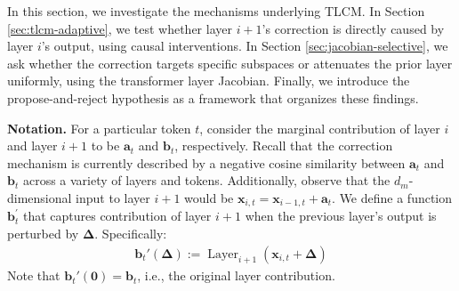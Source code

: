 \label{big_sec:tlcm_adaptive}

In this section, we investigate the mechanisms underlying TLCM. In Section \ref{sec:tlcm-adaptive}, we test whether layer $i+1$'s correction is directly caused by layer $i$'s output, using causal interventions. In Section \ref{sec:jacobian-selective}, we ask whether the correction targets specific subspaces or attenuates the prior layer uniformly, using the transformer layer Jacobian. Finally, we introduce the propose-and-reject hypothesis as a framework that organizes these findings.



\textbf{Notation.} For a particular token $t$, consider the marginal contribution of layer $i$ and layer $i+1$ to be $\mathbf{a}_t$ and $\mathbf{b}_t$, respectively. Recall that the correction mechanism is currently described by a negative cosine similarity between $\mathbf{a}_t$ and $\mathbf{b}_t$ across a variety of layers and tokens. Additionally, observe that the $d_m$-dimensional input to layer $i+1$ would be $\mathbf{x}_{i,t} = \mathbf{x}_{i-1,t} + \mathbf{a}_t$. We define a function $\mathbf{b}_t^\prime$ that captures contribution of layer $i+1$ when the previous layer's output is perturbed by $\mathbf{\Delta}$. Specifically:
\begin{align*}
    \mathbf{b}_t'(\mathbf{\Delta}) := \operatorname{Layer}_{i + 1}(\mathbf{x}_{i,t} + \mathbf{\Delta})
\end{align*}
Note that $\mathbf{b}_t'(\mathbf{0}) = \mathbf{b}_t$, i.e., the original layer contribution. 




